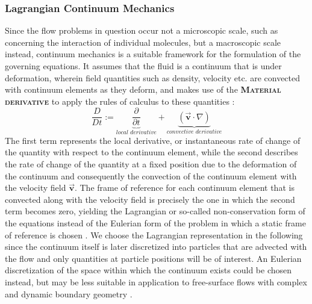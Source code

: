 \documentclass[oneside, a4paper]{book}
\newcommand\emphasis[1]{{\scshape\bfseries#1}}
\newcommand\vek[1]{\vec{\bm{#1}}}
\newcommand\br[1]{\left(#1\right)}
\begin{document}
    \subsubsection{Lagrangian Continuum Mechanics}
    Since the flow problems in question occur not a microscopic scale, such as concerning the interaction of individual molecules, but a macroscopic scale instead, continuum mechanics is a suitable framework for the formulation of the governing equations. It assumes that the fluid is a continuum that is under deformation, wherein field quantities such as density, velocity etc. are convected with continuum elements as they deform, and makes use of the \emphasis{Material derivative} to apply the rules of calculus to these quantities \autocite{anderson}:
      \begin{equation}
        \frac{D}{Dt} := \underbrace{\frac{\partial}{\partial t}}_{\textit{local derivative}} + \underbrace{\br{\vek{v}\cdot \nabla}}_{\textit{convective derivative}}
      \end{equation}
    The first term represents the local derivative, or instantaneous rate of change of the quantity with respect to the continuum element, while the second describes the rate of change of the quantity at a fixed position due to the deformation of the continuum and consequently the convection of the continuum element with the velocity field $\vek{v}$. The frame of reference for each continuum element that is convected along with the velocity field is precisely the one in which the second term becomes zero, yielding the Lagrangian or so-called non-conservation form of the equations instead of the Eulerian form of the problem in which a static frame of reference is chosen \autocite{anderson}. We choose the Lagrangian representation in the following since the continuum itself is later discretized into particles that are advected with the flow and only quantities at particle positions will be of interest. An Eulerian discretization of the space within which the continuum exists could be chosen instead, but may be less suitable in application to free-surface flows with complex and dynamic boundary geometry \autocite{tutorial2019}.
\end{document}
